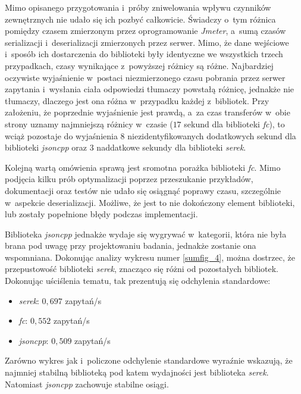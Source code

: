 \documentclass[12pt]{article}
\newcommand{\n}{\newline}
\newcommand{\nonpl}[1]{{\it #1}}
\newcommand{\Jmeter}{\nonpl{Jmeter}\texttrademark}
\newcommand{\serek}{\nonpl{serek}}
\begin{document}
{{{				Mimo opisanego przygotowania i~próby zniwelowania wpływu czynników zewnętrznych nie udało się ich pozbyć całkowicie. Świadczy o~tym różnica pomiędzy czasem
				zmierzonym przez oprogramowanie \Jmeter, a~sumą czasów serializacji i~deserializacji zmierzonych przez serwer. Mimo, że dane wejściowe i~sposób ich dostarczenia
				do biblioteki były identyczne we wszystkich trzech przypadkach, czasy wynikające z~powyższej różnicy są różne. Najbardziej oczywiste wyjaśnienie w~postaci niezmierzonego czasu
				pobrania przez serwer zapytania i~wysłania ciała odpowiedzi tłumaczy powstałą różnicę, jednakże nie tłumaczy, dlaczego jest ona różna w~przypadku każdej z~bibliotek.
				Przy założeniu, że poprzednie wyjaśnienie jest prawdą, a~za czas transferów w~obie strony uznamy najmniejszą różnicy w~czasie ($17$ sekund dla biblioteki \nonpl{fc}), to wciąż
				pozostaje do wyjaśnienia $8$ niezidentyfikowanych dodatkowych sekund dla biblioteki \nonpl{jsoncpp} oraz $3$ naddatkowe sekundy dla biblioteki \serek.\n

				Kolejną wartą omówienia sprawą jest sromotna porażka biblioteki \nonpl{fc}. Mimo podjęcia kilku prób optymalizacji poprzez przeszukanie przykładów, dokumentacji
				oraz testów nie udało się osiągnąć poprawy czasu, szczególnie w~aspekcie deserializacji. Możliwe, że jest to nie dokończony element biblioteki, lub zostały popełnione
				błędy podczas implementacji.\n

				Biblioteka \nonpl{jsoncpp} jednakże wydaje się wygrywać w~kategorii, która nie była brana pod uwagę przy projektowaniu badania, jednakże zostanie
				ona wspomniana. Dokonując analizy wykresu numer \ref{sumfig_4}, można dostrzec, że przepustowość biblioteki \serek, znacząco się różni od pozostałych bibliotek.
				Dokonując uściślenia tematu, tak prezentują się odchylenia standardowe:

				{
					\begin{itemize}
						\setlength\itemsep{-2mm}
						\item \serek: $0,697$ zapytań/s
						\item \nonpl{fc}: $0,552$ zapytań/s
						\item \nonpl{jsoncpp}: $0,509$ zapytań/s
					\end{itemize}
				}

				Zarówno wykres jak i~policzone odchylenie standardowe wyraźnie wskazują, że najmniej stabilną biblioteką pod katem wydajności jest biblioteka \serek.
				Natomiast \nonpl{jsoncpp} zachowuje stabilne osiągi.
			}
		}

}
\end{document}
